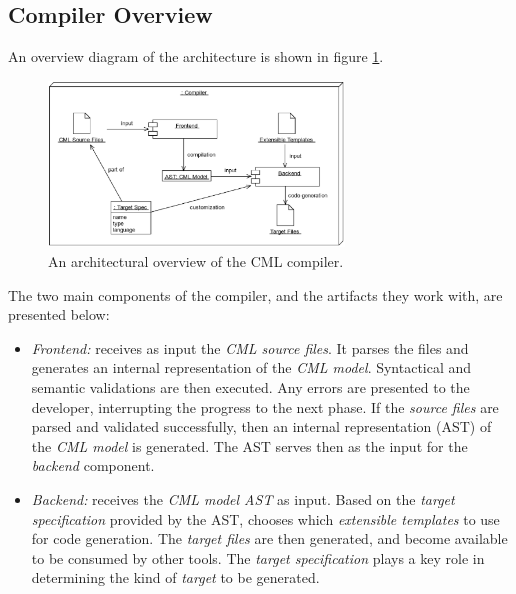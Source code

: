 \subsection{Compiler Overview}\label{subsec:overview}

An overview diagram of the architecture is shown in figure \ref{fig:overview}.

\begin{figure}
\centering
\includegraphics[width=0.7\textwidth]{compiler/figure-overview}
\caption{An architectural overview of the CML compiler.}
\label{fig:overview}
\end{figure}

The two main components of the compiler,
and the artifacts they work with,
are presented below:

\begin{itemize}

\item \emph{Frontend:} receives as input the \emph{CML source files}.
It parses the files and generates an internal representation of the \emph{CML model}.
Syntactical and semantic validations are then executed.
Any errors are presented to the developer, interrupting the progress to the next phase.
If the \emph{source files} are parsed and validated successfully, then an internal representation (AST) of the \emph{CML model} is generated.
The AST serves then as the input for the \emph{backend} component.

\item \emph{Backend:} receives the \emph{CML model AST} as input.
Based on the \emph{target specification} provided by the AST, chooses which \emph{extensible templates} to use for code generation.
The \emph{target files} are then generated, and become available to be consumed by other tools. The \emph{target specification} plays a key role in determining the kind of \emph{target} to be generated.

\end{itemize}

